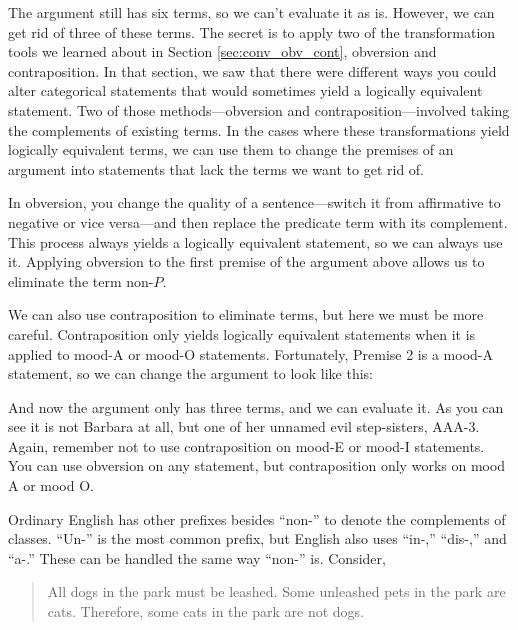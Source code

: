 The argument still has six terms, so we can't evaluate it as is. However, we can get rid of three of these terms. The secret is to apply two of the transformation tools we learned about in Section \ref{sec:conv_obv_cont}, obversion and contraposition. In that section, we saw that there were different ways you could alter categorical statements that would sometimes yield a logically equivalent statement. Two of those methods---obversion and contraposition---involved taking the complements of existing terms. In the cases where these transformations yield logically equivalent terms, we can use them to change the premises of an argument into statements that lack the terms we want to get rid of.

In obversion, you change the quality of a sentence---switch it from affirmative to negative or vice versa---and then replace the predicate term with its complement. This process always yields a logically equivalent statement, so we can always use it. Applying obversion to the first premise of the argument above allows us to eliminate the term non-$P$.

\begin{kormanize}
\end{kormanize}

We can also use contraposition to eliminate terms, but here we must be more careful. Contraposition only yields logically equivalent statements when it is applied to mood-A or mood-O statements. Fortunately, Premise 2 is a mood-A statement, so we can change the argument to look like this:

\begin{kormanize}
\end{kormanize}

And now the argument only has three terms, and we can evaluate it. As you can see it is not Barbara at all, but one of her unnamed evil step-sisters, AAA-3. Again, remember not to use contraposition on mood-E or mood-I statements. You can use obversion on any statement, but contraposition only works on mood A or mood O.

Ordinary English has other prefixes besides ``non-'' to denote the complements of classes. ``Un-'' is the most common prefix, but English also uses ``in-,'' ``dis-,'' and ``a-.'' These can be handled the same way ``non-'' is. Consider,

\begin{quotation}
All dogs in the park must be leashed. Some unleashed pets in the park are cats. Therefore, some cats in the park are not dogs.
\end{quotation}

